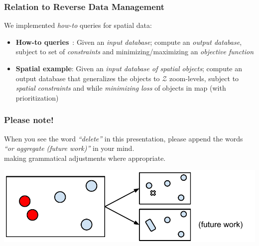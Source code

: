 \documentclass{beamer}
\begin{document}
\frame
{
  \frametitle{Relation to Reverse Data Management}

  We implemented \emph{how-to} queries for spatial data:
  \begin{itemize}
  \item \textbf{How-to queries}~\cite{reversedatamanagement}: Given an \emph{input database}; compute an \emph{output database}, subject to set of \emph{constraints} and minimizing/maximizing an \emph{objective function}
  \item \textbf{Spatial example}: Given an \emph{input database of spatial objects}; compute an output database that generalizes the objects to $\mathcal{Z}$ zoom-levels, subject to \emph{spatial constraints} and while \emph{minimizing loss} of objects in map (with prioritization)
  \end{itemize}
}

\frame
{
  \frametitle{Please note!}
  When you see the word \emph{``delete''} in this presentation, please append the words \emph{``or aggregate (future work)''} in your mind. \\
  making grammatical adjustments where appropriate.
  
  \begin{center}
  \includegraphics[scale=0.50]{figs/cvl-delete-aggregate.pdf}
  \end{center}

}
\end{document}
